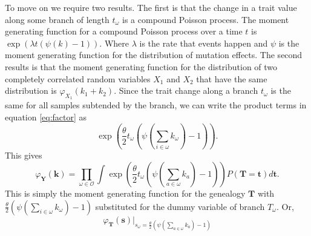 To move on we require two results. The first is that the change in a
trait value along some branch of length $t_\omega$ is a compound
Poisson process. The moment generating function for a compound Poisson
process over a time $t$ is $\exp\left(\lambda t (\psi(k)-1)\right)$.
Where $\lambda$ is the rate that events happen and $\psi$ is the
moment generating function for the distribution of mutation effects.
The second results is that the moment generating function for the
distribution of two completely correlated random variables $X_1$ and
$X_2$ that have the same distribution is $\varphi_{X_1}(k_1+k_2)$. Since
the trait change along a branch $t_{\omega}$ is the same for all
samples subtended by the branch, we can write the product terms in
equation \ref{eq:factor} as
\begin{equation}
  \exp\left( \frac{\theta}{2} t_{\omega} \left( \psi\left(\sum_{i \in \omega}k_{\omega}\right) -1 \right)\right).
\end{equation}
This gives
\begin{equation}
  \varphi_{\mathbf{Y}}(\mathbf{k}) = \prod_{\omega \in \mathcal{O}}
  \int \exp\left( \frac{\theta}{2} t_{\omega} \left( \psi\left(\sum_{a \in \omega}k_{a}\right) -1 \right)\right)
  P(\mathbf{T}=\mathbf{t})d\mathbf{t}.
\end{equation}
This is simply the moment generating function for the genealogy
$\mathbf{T}$ with $\frac{\theta}{2} \left( \psi(\sum_{i \in
  \omega}k_{\omega}) -1 \right)$ substituted for the dummy variable of
branch $T_{\omega}$. Or,
\begin{equation}
  \label{eq:sub}
  \varphi_{\mathbf{T}}(\mathbf{s})\Bigr|_{s_{\omega}=\frac{\theta}{2} \left( \psi\left(\sum_{a \in \omega}k_{a}\right) -1 \right)}
\end{equation}

